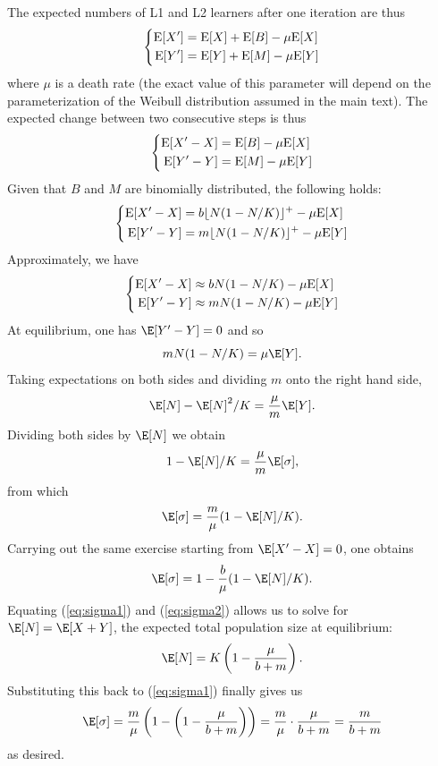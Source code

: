 The expected numbers of L1 and L2 learners after one iteration are thus
\[
\left\{
\begin{aligned}
\textnormal{E}[X'] &= \textnormal{E}[X] + \textnormal{E}[B] - \mu \textnormal{E}[X] \\
\textnormal{E}[Y'] &= \textnormal{E}[Y] + \textnormal{E}[M] - \mu \textnormal{E}[Y]
\end{aligned}
\right.
\] where \(\mu\) is a death rate (the exact value of this parameter will
depend on the parameterization of the Weibull distribution assumed in
the main text). The expected change between two consecutive steps is
thus \[
\left\{
\begin{aligned}
\textnormal{E}[X' - X] &= \textnormal{E}[B] - \mu \textnormal{E}[X] \\
\textnormal{E}[Y' - Y] &= \textnormal{E}[M] - \mu \textnormal{E}[Y]
\end{aligned}
\right.
\] Given that \(B\) and \(M\) are binomially distributed, the following
holds: \[
\left\{
\begin{aligned}
\textnormal{E}[X' - X] &= b \lfloor N(1 - N/K) \rfloor^+ - \mu \textnormal{E}[X] \\
\textnormal{E}[Y' - Y] &= m \lfloor N(1 - N/K) \rfloor^+ - \mu \textnormal{E}[Y]
\end{aligned}
\right.
\] Approximately, we have \[
\left\{
\begin{aligned}
\textnormal{E}[X' - X] &\approx b N(1 - N/K) - \mu \textnormal{E}[X] \\
\textnormal{E}[Y' - Y] &\approx m N(1 - N/K) - \mu \textnormal{E}[Y]
\end{aligned}
\right.
\] At equilibrium, one has \(\E [Y' - Y] = 0\) and so \[
m N(1 - N/K) = \mu \E [Y].
\] Taking expectations on both sides and dividing \(m\) onto the right
hand side, \[
\E [N] - \E [N]^2/K = \frac{\mu}{m} \E [Y].
\] Dividing both sides by \(\E [N]\) we obtain \[
1 - \E [N]/K = \frac{\mu}{m} \E [\sigma],
\] from which \begin{equation}
\E [\sigma] = \frac{m}{\mu} (1 - \E [N]/K).
\label{eq:sigma1}\end{equation} Carrying out the same exercise starting
from \(\E [X' - X] = 0\), one obtains \begin{equation}
\E [\sigma] = 1 - \frac{b}{\mu} (1 - \E [N]/K).
\label{eq:sigma2}\end{equation} Equating (\ref{eq:sigma1}) and
(\ref{eq:sigma2}) allows us to solve for \(\E [N] = \E [X + Y]\), the
expected total population size at equilibrium: \[
\E [N] = K\left(1 - \frac{\mu}{b + m} \right).
\] Substituting this back to (\ref{eq:sigma1}) finally gives us \[
\E [\sigma] = \frac{m}{\mu} \left(1 - \left(1 - \frac{\mu}{b + m}\right)\right) = \frac{m}{\mu} \cdot \frac{\mu}{b + m} = \frac{m}{b + m}
\] as desired.

